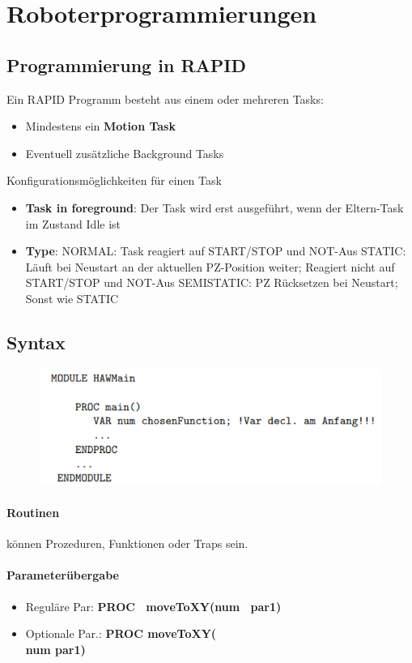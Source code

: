 \section{Roboterprogrammierungen}
\subsection{Programmierung in RAPID}
Ein RAPID Programm besteht aus einem oder mehreren Tasks:
\begin{itemize}
	\item Mindestens ein \textbf{Motion Task}
	\item Eventuell zusätzliche Background Tasks
\end{itemize}
Konfigurationsmöglichkeiten für einen Task
\begin{itemize}
	\item \textbf{Task in foreground}: Der Task wird erst ausgeführt, wenn der Eltern-Task im Zustand Idle ist
	\item \textbf{Type}:
	\subitem NORMAL: Task reagiert auf START/STOP und NOT-Aus
	\subitem STATIC: Läuft bei Neustart an der aktuellen PZ-Position weiter; Reagiert nicht auf START/STOP und NOT-Aus
	\subitem SEMISTATIC: PZ Rücksetzen bei Neustart; Sonst wie STATIC
\end{itemize}
\subsection{Syntax}
\begin{figure}[H]
	\begin{center}
		\includegraphics[scale=0.8]{resources/PNG/Syntax1.PNG}
		\caption{}
		\label{fig:resources/PNG/Syntax1.PNG}
	\end{center}
\end{figure}
\paragraph{Routinen}
können Prozeduren, Funktionen oder Traps sein.
\paragraph{Parameterübergabe}
\begin{itemize}
	\item Reguläre Par: \textbf{PROC \ moveToXY(num \ par1)}
	\item Optionale Par.: \textbf{PROC moveToXY(\\num par1)}
\end{itemize}

